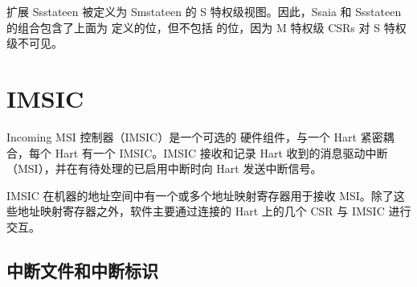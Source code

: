 \begin{translation}
扩展 Ssstateen 被定义为 Smstateen 的 S 特权级视图。因此，Ssaia 和 Ssstateen 的组合包含了上面为  定义的位，但不包括  的位，因为 M 特权级 CSRs 对 S 特权级不可见。

\section{IMSIC}

Incoming MSI 控制器（IMSIC）是一个可选的 {\RISCV} 硬件组件，与一个 Hart 紧密耦合，每个 Hart 有一个 IMSIC。IMSIC 接收和记录 Hart 收到的消息驱动中断（MSI），并在有待处理的已启用中断时向 Hart 发送中断信号。

IMSIC 在机器的地址空间中有一个或多个地址映射寄存器用于接收 MSI。除了这些地址映射寄存器之外，软件主要通过连接的 Hart 上的几个 {\RISCV} CSR 与 IMSIC 进行交互。

\subsection{中断文件和中断标识}

\end{translation}
